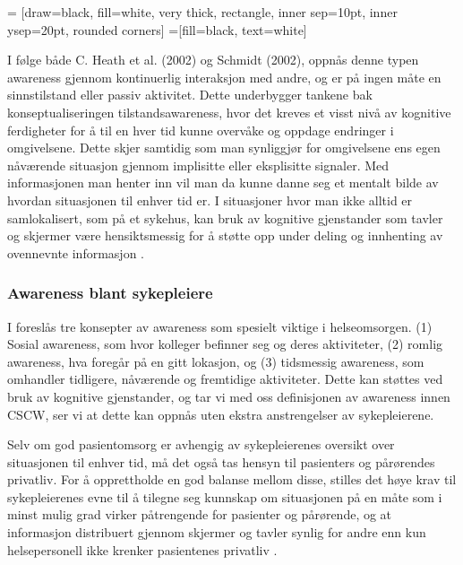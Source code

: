  = [draw=black, fill=white, very thick,
    rectangle, inner sep=10pt, inner ysep=20pt, rounded corners]
 =[fill=black, text=white]
%

\noindent
I følge både C. Heath et al. (2002) og Schmidt (2002), oppnås denne typen awareness gjennom kontinuerlig interaksjon med andre, og er på ingen måte en sinnstilstand eller passiv aktivitet. Dette underbygger tankene bak konseptualiseringen tilstandsawareness, hvor det kreves et visst nivå av kognitive ferdigheter for å til en hver tid kunne overvåke og oppdage endringer i omgivelsene. Dette skjer samtidig som man synliggjør for omgivelsene ens egen nåværende situasjon gjennom implisitte eller eksplisitte signaler. Med informasjonen man henter inn vil man da kunne danne seg et mentalt bilde av hvordan situasjonen til enhver tid er. I situasjoner hvor man ikke alltid er samlokalisert, som på et sykehus, kan bruk av kognitive gjenstander som tavler og skjermer være hensiktsmessig for å støtte opp under deling og innhenting av ovennevnte informasjon \cite{Bardram04}. 

\subsubsection{Awareness blant sykepleiere}
I \cite{Randell} foreslås tre konsepter av awareness som spesielt viktige i helseomsorgen. (1) Sosial awareness, som hvor kolleger befinner seg og deres aktiviteter, (2) romlig awareness, hva foregår på en gitt lokasjon, og (3) tidsmessig awareness, som omhandler tidligere, nåværende og fremtidige aktiviteter. 
Dette kan støttes ved bruk av kognitive gjenstander, og tar vi med oss definisjonen av awareness innen CSCW, ser vi at dette kan oppnås uten ekstra anstrengelser av sykepleierene.

\noindent
Selv om god pasientomsorg er avhengig av sykepleierenes oversikt over situasjonen til enhver tid, må det også tas hensyn til pasienters og pårørendes privatliv. For å opprettholde en god balanse mellom disse, stilles det høye krav til sykepleierenes evne til å tilegne seg kunnskap om situasjonen på en måte som i minst mulig grad virker påtrengende for pasienter og pårørende, og at informasjon distribuert gjennom skjermer og tavler synlig for andre enn kun helsepersonell ikke krenker pasientenes privatliv \cite{Ebright10}.

